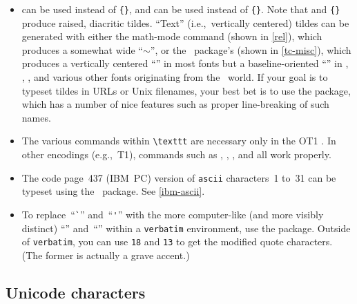 \begin{itemize}
  \item \label{page:tildes}  \cmdI{\textasciicircum}
  can be used instead of \cmdI[\string\^{}]{\^{}}\verb|{}|, and
  \cmdI{\textasciitilde} can be used instead of
  \cmdI[\string\~{}]{\~{}}\verb|{}|.  Note that
  \cmdI{\textasciitilde} and \cmdI[\string\~{}]{\~{}}\verb|{}|
  produce raised, diacritic tildes.  ``Text''
  (i.e.,~vertically centered)
  tildes can be generated with either the math-mode \cmdX{\sim}
  command (shown in \vref{rel}), which produces a somewhat wide
  ``$\sim$'', or the \TC\ package's \cmdI{\texttildelow} (shown in
  \vref{tc-misc}), which produces a vertically centered
  ``{\selectfont\texttildelow}'' in most fonts but a
  baseline-oriented ``\texttildelow'' in ,
  \TX, \PX, and various other fonts originating from the
  \tex\ world.  If your goal is to typeset tildes in URLs or Unix
  filenames, your best bet is to use the  package,
  which has a number of nice features such as proper line-breaking
  of such names.

  \item The various \cmd{\char} commands within \verb|\texttt| are
  necessary only in the OT1 \fntenc[OT1].  In other encodings
  (e.g.,~T1), commands such as \cmdIp{\{},
  \cmdIp{\}}, \cmdI{\_}, and \cmdI{\textbackslash} all work properly.

  \item The code page~437 (IBM~PC)
  version of \texttt{ascii} characters~1 to~31 can be typeset
  using the \ASCII\ package.
\ifASCII
  See \vref{ibm-ascii}.
\fi

  \item To replace~``\verb|`|'' and~``\verb|'|'' with the more
  computer-like (and more visibly distinct) ``\texttt{}''
  and~``\texttt{}'' within a \texttt{verbatim} environment,
  use the  package.  Outside of \texttt{verbatim},
  you can use \cmd{\char}\texttt{18} and \cmd{\char}\texttt{13} to
  get the modified quote characters.  (The former is actually a
  grave accent.)
\end{itemize}





\subsection{Unicode characters}
\label{unicode-chars}

